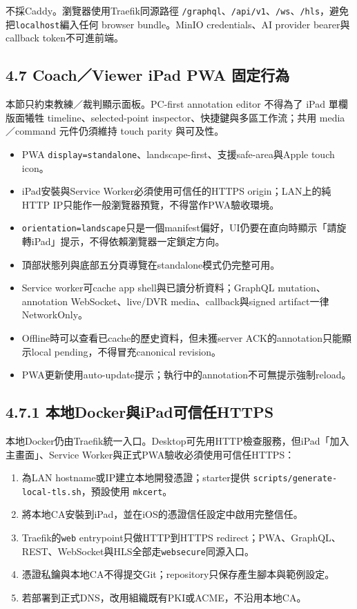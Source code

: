 \documentclass[
  9pt,
  a4paper,
]{article}
\providecommand{\tightlist}{%
  \setlength{\itemsep}{0pt}\setlength{\parskip}{0pt}}
\begin{document}
不採Caddy。瀏覽器使用Traefik同源路徑
\texttt{/graphql}、\texttt{/api/v1}、\texttt{/ws}、\texttt{/hls}，避免把\texttt{localhost}編入任何 browser
bundle。MinIO credentials、AI provider bearer與callback
token不可進前端。

\subsection{4.7 Coach／Viewer iPad PWA
固定行為}\label{47-ipad-pwa-ux56faux5b9aux884cux70ba}

本節只約束教練／裁判顯示面板。PC-first annotation editor 不得為了 iPad 單欄版面犧牲 timeline、selected-point inspector、快捷鍵與多區工作流；共用 media／command 元件仍須維持 touch parity 與可及性。

\begin{itemize}
\tightlist
\item
  PWA \texttt{display=standalone}、landscape-first、支援safe-area與Apple
  touch icon。
\item
  iPad安裝與Service Worker必須使用可信任的HTTPS origin；LAN上的純HTTP
  IP只能作一般瀏覽器預覽，不得當作PWA驗收環境。
\item
  \texttt{orientation=landscape}只是一個manifest偏好，UI仍要在直向時顯示「請旋轉iPad」提示，不得依賴瀏覽器一定鎖定方向。
\item
  頂部狀態列與底部五分頁導覽在standalone模式仍完整可用。
\item
  Service worker可cache app shell與已讀分析資料；GraphQL
  mutation、annotation WebSocket、live/DVR media、callback與signed
  artifact一律NetworkOnly。
\item
  Offline時可以查看已cache的歷史資料，但未獲server
  ACK的annotation只能顯示local pending，不得冒充canonical revision。
\item
  PWA更新使用auto-update提示；執行中的annotation不可無提示強制reload。
\end{itemize}

\subsection{4.7.1
本地Docker與iPad可信任HTTPS}\label{471-ux672cux5730dockerux8207ipadux53efux4fe1ux4efbhttps}

本地Docker仍由Traefik統一入口。Desktop可先用HTTP檢查服務，但iPad「加入主畫面」、Service
Worker與正式PWA驗收必須使用可信任HTTPS：

\begin{enumerate}
\def\labelenumi{\arabic{enumi}.}
\tightlist
\item
  為LAN hostname或IP建立本地開發憑證；starter提供
  \texttt{scripts/generate-local-tls.sh}，預設使用 \texttt{mkcert}。
\item
  將本地CA安裝到iPad，並在iOS的憑證信任設定中啟用完整信任。
\item
  Traefik的\texttt{web} entrypoint只做HTTP到HTTPS
  redirect；PWA、GraphQL、REST、WebSocket與HLS全部走\texttt{websecure}同源入口。
\item
  憑證私鑰與本地CA不得提交Git；repository只保存產生腳本與範例設定。
\item
  若部署到正式DNS，改用組織既有PKI或ACME，不沿用本地CA。
\end{enumerate}
\end{document}
